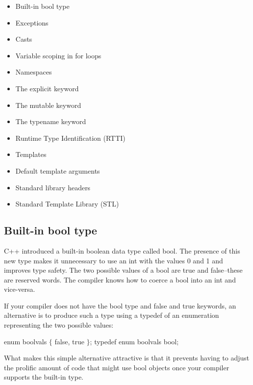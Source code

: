 \begin{itemize}
    \item Built-in bool type

    \item Exceptions

    \item Casts

    \item Variable scoping in for loops

    \item Namespaces

    \item The explicit keyword

    \item The mutable keyword

    \item The typename keyword

    \item Runtime Type Identification (RTTI)

    \item Templates

    \item Default template arguments

    \item Standard library headers

    \item Standard Template Library (STL) 
\end{itemize}

\subsection{Built-in bool type}

C++ introduced a built-in boolean data type called bool. The presence of this new type makes it unnecessary to use an int with the values 0 and 1 and improves type safety. The two possible values of a bool are true and false--these are reserved words. The compiler knows how to coerce a bool into an int and vice-versa.

If your compiler does not have the bool type and false and true keywords, an alternative is to produce such a type using a typedef of an enumeration representing the two possible values:

 	

enum boolvals $\{$ false, true $\}$;
typedef enum boolvals bool;

What makes this simple alternative attractive is that it prevents having to adjust the prolific amount of code that might use bool objects once your compiler supports the built-in type. 

